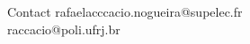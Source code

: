 \begin{frame}{Contact}
\small \flushright
rafaelacccacio.nogueira@supelec.fr
\\raccacio@poli.ufrj.br
\end{frame}